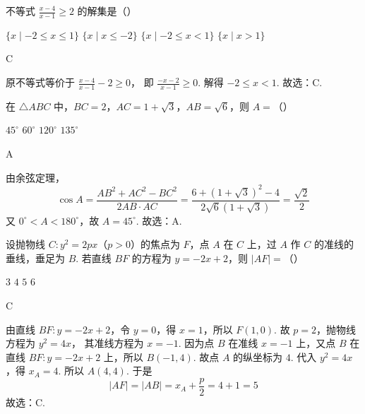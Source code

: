 \documentclass[UTF8,a4paper,oneside,11pt]{ctexbook}
\begin{document}
\begin{problem}
不等式 \(\frac{x-4}{x-1}\ge 2\) 的解集是（\quad）

\choices
    {\(\{x \mid -2\le x\le 1\}\)}
    {\(\{x \mid x\le -2\}\)}
    {\(\{x \mid -2\le x<1\}\)}
    {\(\{x \mid x>1\}\)}
\end{problem}

\begin{answer}
C
\end{answer}

\begin{solution}
原不等式等价于
\(\frac{x-4}{x-1}-2\ge 0\)，
即
\(\frac{-x-2}{x-1}\ge 0\).
解得 \(-2\le x<1\). 故选：C.
\end{solution}

\begin{problem}
在 \(\triangle ABC\) 中，\(BC=2\)，\(AC=1+\sqrt3\)，\(AB=\sqrt6\)，则 \(A=\)（\quad）

\choices
    {\(45^\circ\)}
    {\(60^\circ\)}
    {\(120^\circ\)}
    {\(135^\circ\)}
\end{problem}

\begin{answer}
A
\end{answer}

\begin{solution}
由余弦定理，
\[
\cos A=\frac{AB^2+AC^2-BC^2}{2AB\cdot AC}
=\frac{6+\left(1+\sqrt3\right)^2-4}{2\sqrt6\left(1+\sqrt3\right)}
=\frac{\sqrt2}{2}
\]
又 \(0^\circ<A<180^\circ\)，故 \(A=45^\circ\). 故选：A.
\end{solution}

\begin{problem}
设抛物线 \(C:y^2=2px\)（\(p>0\)）的焦点为 \(F\)，点 \(A\) 在 \(C\) 上，过 \(A\) 作 \(C\) 的准线的垂线，垂足为 \(B\). 若直线 \(BF\) 的方程为 \(y=-2x+2\)，则 \(|AF|=\)（\quad）

\choices
    {\(3\)}
    {\(4\)}
    {\(5\)}
    {\(6\)}
\end{problem}

\begin{answer}
C
\end{answer}

\begin{solution}
由直线 \(BF:y=-2x+2\)，令 \(y=0\)，得 \(x=1\)，所以 \(F(1,0)\). 故 \(p=2\)，抛物线方程为
\(y^2=4x\)，
其准线方程为 \(x=-1\).
因为点 \(B\) 在准线 \(x=-1\) 上，又点 \(B\) 在直线 \(BF:y=-2x+2\) 上，所以
\(B(-1,4)\).
故点 \(A\) 的纵坐标为 \(4\). 代入 \(y^2=4x\)，得
\(x_A=4\).
所以 \(A(4,4)\).
于是
\[
\lvert AF\rvert=\lvert AB\rvert=x_A+\frac p2=4+1=5
\]
故选：C.
\end{solution}
\end{document}
